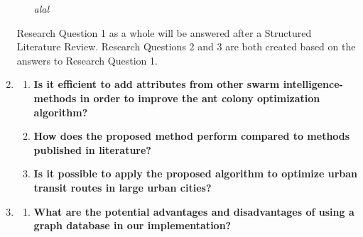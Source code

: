 \begin{enumerate}[label=\textbf{\arabic*})]
\begin{enumerate}
    \newline
    \emph{\color{blue} alal }
	\end{enumerate}
    Research Question 1 as a whole will be answered after a Structured Literature Review\citep{kofod2014}. Research Questions 2 and 3 are both created based on the answers to Research Question 1. 
\item \label{itm:2}
    \begin{enumerate}
    \item \label{itm:2a} \textbf{Is it efficient to add attributes from other swarm intelligence-methods in order to improve the ant colony optimization algorithm?}
    \item \label{itm:2b1} \textbf{How does the proposed method perform compared to methods published in literature?}
    \item \label{itm:2c} \textbf{Is it possible to apply the proposed algorithm to optimize urban transit routes in large urban cities?}
    \end{enumerate}
\item \label{itm:3}
	\begin{enumerate}
	\item \label{itm:3a} \textbf{What are the potential advantages and disadvantages of using a graph database in our implementation?}
    \end{enumerate}
\end{enumerate}